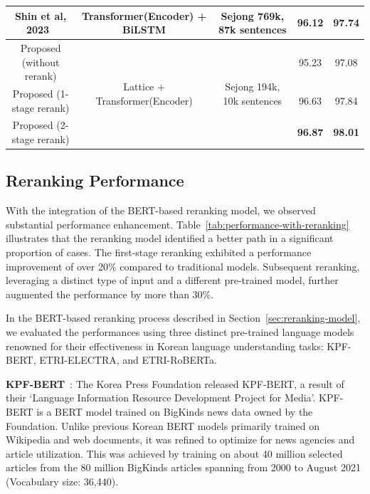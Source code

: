\documentclass[AMS,STIX2COL]{WileyNJD-v2}
\begin{document}
\begin{table}[ht]
\begin{tabular*}{500pt}{@{\extracolsep\fill}ccc|cc@{\extracolsep\fill}}
            Shin et al, 2023~\cite{ShinHJ2023}    & Transformer(Encoder) + BiLSTM                   & Sejong 769k, 87k sentences                  & 96.12                      & 97.74                        \\
            \midrule
            Proposed (without rerank)             & \multirow{3}{*}{Lattice + Transformer(Encoder)} & \multirow{3}{*}{Sejong 194k, 10k sentences} & 95.23                      & 97.08                        \\
            Proposed (1-stage rerank)             & ~                                               & ~                                           & 96.63                      & 97.84                        \\
            Proposed (2-stage rerank)             & ~                                               & ~                                           & \textbf{96.87}             & \textbf{98.01}               \\
            \bottomrule
        \end{tabular*}
    \end{table}

    \subsection{Reranking Performance}\label{subsec:reranking-performance}

    With the integration of the BERT-based reranking model, we observed substantial performance enhancement.
    Table~\ref{tab:performance-with-reranking} illustrates that the reranking model identified a better path in a significant proportion of cases.
    The first-stage reranking exhibited a performance improvement of over 20\% compared to traditional models.
    Subsequent reranking, leveraging a distinct type of input and a different pre-trained model, further augmented the performance by more than 30\%.

    In the BERT-based reranking process described in Section~\ref{sec:reranking-model}, we evaluated the performances using three distinct pre-trained language models renowned for their effectiveness in Korean language understanding tasks: KPF-BERT, ETRI-ELECTRA, and ETRI-RoBERTa.

    \textbf{KPF-BERT}~\cite{KPF_BERT}: The Korea Press Foundation released KPF-BERT, a result of their `Language Information Resource Development Project for Media'.
    KPF-BERT is a BERT model trained on BigKinds news data owned by the Foundation.
    Unlike previous Korean BERT models primarily trained on Wikipedia and web documents, it was refined to optimize for news agencies and article utilization.
    This was achieved by training on about 40 million selected articles from the 80 million BigKinds articles spanning from 2000 to August 2021 (Vocabulary size: 36,440).
\end{document}
